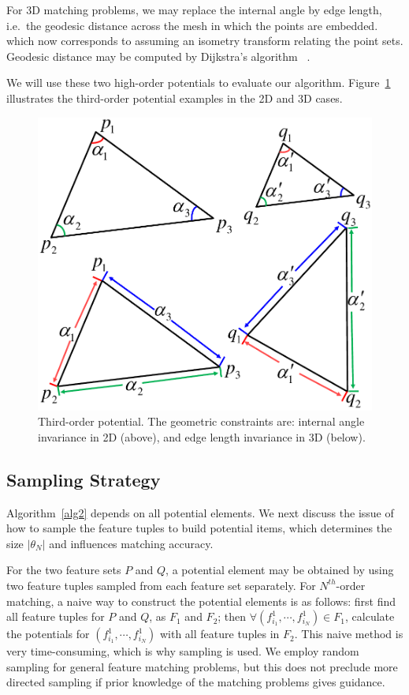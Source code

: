 For 3D matching problems, we may replace the internal angle by edge length, i.e.\ the geodesic distance across the mesh in which the points are embedded. which now corresponds to assuming
an isometry transform relating the point sets.
Geodesic distance may be computed by  Dijkstra's algorithm~\cite{Peyre2010} .

We will use these two high-order potentials to evaluate our algorithm.
Figure~\ref{fig:TO} illustrates the  third-order potential examples in the 2D and 3D cases.

\begin{figure}
\centering
  \includegraphics[width=0.7\linewidth]{figures/diagram.pdf}
  \caption{Third-order potential. The geometric constraints are: internal angle invariance in 2D (above), and edge length invariance in 3D (below).}
\label{fig:TO}
\end{figure}

\subsection{Sampling Strategy}
\label{subsec:sampling}

Algorithm~\ref{alg2} depends on all potential elements.
We next discuss the issue of how to sample the feature tuples to build potential items, which determines the size $|\theta_N|$ and influences matching accuracy.

For the two feature sets $P$ and $Q$,
a potential element may be obtained by using two feature tuples sampled from each feature set separately.
For $N^{th}$-order matching, a naive way to construct the potential elements is as follows:
first find all feature tuples for $P$ and $Q$, as $F_1$ and $F_2$; then $\forall (f_{i_1}^1, \cdots, f_{i_N}^1)\in F_1$,
calculate the potentials for $(f_{i_1}^1, \cdots, f_{i_N}^1)$ with all feature tuples in $F_2$.
This naive method is very time-consuming, which is why sampling is used.
We employ random sampling for general feature matching problems,
but this does not preclude more directed sampling if prior knowledge of the matching problems gives guidance.

